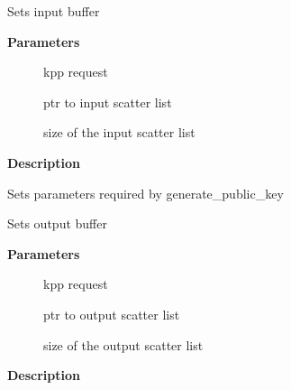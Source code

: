 \documentclass[a4paper,8pt,english]{sphinxmanual}
\begin{document}
\begin{fulllineitems}
\label{crypto/api-kpp:c.kpp_request_set_input}
Sets input buffer

\end{fulllineitems}


\textbf{Parameters}
\begin{description}
\item[{}] \leavevmode
kpp request

\item[{}] \leavevmode
ptr to input scatter list

\item[{}] \leavevmode
size of the input scatter list

\end{description}

\textbf{Description}

Sets parameters required by generate\_public\_key

\begin{fulllineitems}
\label{crypto/api-kpp:c.kpp_request_set_output}
Sets output buffer

\end{fulllineitems}


\textbf{Parameters}
\begin{description}
\item[{}] \leavevmode
kpp request

\item[{}] \leavevmode
ptr to output scatter list

\item[{}] \leavevmode
size of the output scatter list

\end{description}

\textbf{Description}
\end{document}

